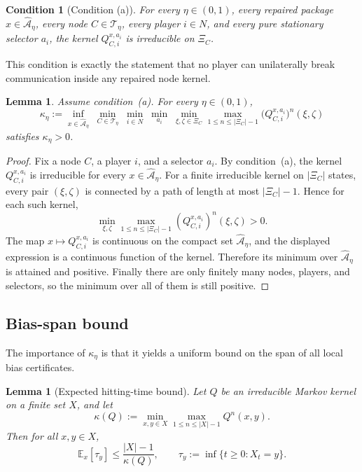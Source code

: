 \documentclass[12pt]{article}
\newtheorem{lemma}[theorem]{Lemma}
\newtheorem{condition}[theorem]{Condition}
\theoremstyle{definition}
\newcommand{\E}{\mathbb{E}}
\newcommand{\1}{\mathbf{1}}
\newcommand{\cA}{\mathcal{A}}
\newcommand{\cT}{\mathcal{T}}
\begin{document}
\begin{condition}[Condition \textnormal{(a)}]
\label{cond:a}
For every \(\eta\in(0,1)\), every repaired package \(x\in \widehat{\cA}_\eta\), every node
\(C\in \cT_\eta\), every player \(i\in N\), and every pure stationary selector \(a_i\),
the kernel \(Q_{C,i}^{x,a_i}\) is irreducible on \(\Xi_C\).
\end{condition}

This condition is exactly the statement that no player can unilaterally break
communication inside any repaired node kernel.

\begin{lemma}
\label{lem:kappa}
Assume condition~\textnormal{(a)}.  For every \(\eta\in(0,1)\),
\[
\kappa_\eta
:=
\inf_{x\in \widehat{\cA}_\eta}\;
\min_{C\in \cT_\eta}\;
\min_{i\in N}\;
\min_{a_i}\;
\min_{\xi,\zeta\in \Xi_C}
\max_{1\le n\le |\Xi_C|-1}
\bigl(Q_{C,i}^{x,a_i}\bigr)^n(\xi,\zeta)
\]
satisfies \(\kappa_\eta>0\).
\end{lemma}

\begin{proof}
Fix a node \(C\), a player \(i\), and a selector \(a_i\).  By condition~(a), the kernel
\(Q_{C,i}^{x,a_i}\) is irreducible for every \(x\in \widehat{\cA}_\eta\).  For a finite
irreducible kernel on \(|\Xi_C|\) states, every pair \((\xi,\zeta)\) is connected by a path
of length at most \(|\Xi_C|-1\).  Hence for each such kernel,
\[
\min_{\xi,\zeta}\max_{1\le n\le |\Xi_C|-1} (Q_{C,i}^{x,a_i})^n(\xi,\zeta)>0.
\]
The map \(x\mapsto Q_{C,i}^{x,a_i}\) is continuous on the compact set
\(\widehat{\cA}_\eta\), and the displayed expression is a continuous function of the
kernel.  Therefore its minimum over \(\widehat{\cA}_\eta\) is attained and positive.
Finally there are only finitely many nodes, players, and selectors, so the minimum over
all of them is still positive.
\end{proof}

\subsection{Bias-span bound}

The importance of \(\kappa_\eta\) is that it yields a uniform bound on the span of all
local bias certificates.

\begin{lemma}[Expected hitting-time bound]
\label{lem:hitting}
Let \(Q\) be an irreducible Markov kernel on a finite set \(X\), and let
\[
\kappa(Q):=\min_{x,y\in X}\max_{1\le n\le |X|-1}Q^n(x,y).
\]
Then for all \(x,y\in X\),
\[
\E_x[\tau_y]\le \frac{|X|-1}{\kappa(Q)},
\qquad
\tau_y:=\inf\{t\ge 0:X_t=y\}.
\]
\end{lemma}
\end{document}
